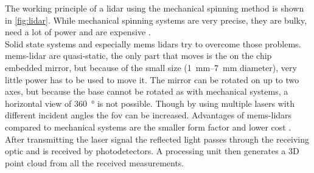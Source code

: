 The working principle of a \gls{lidar} using the mechanical spinning method is shown in \cref{fig:lidar}.
While mechanical spinning systems are very precise, they are bulky, need a lot of power and are expensive \cite{Fujii2005}.\\
Solid state systems and especially \gls{mems} \gls{lidar}s try to overcome those problems.
\gls{mems}-\gls{lidar} are quasi-static, the only part that moves is the on the chip embedded mirror, but because of the small size (\SIrange{1}{7}{\milli\metre} diameter), very little power has to be used to move it.
The mirror can be rotated on up to two axes, but because the base cannot be rotated as with mechanical systems, a horizontal view of \SI{360}{\degree} is not possible.
Though by using multiple lasers with different incident angles the \gls{fov} can be increased.
Advantages of \gls{mems}-\gls{lidar}s compared to mechanical systems are the smaller form factor and lower cost \cite{Wang2020}.\\
After transmitting the laser signal the reflected light passes through the receiving optic and is received by photodetectors.
A processing unit then generates a 3D point cloud from all the received measurements.


